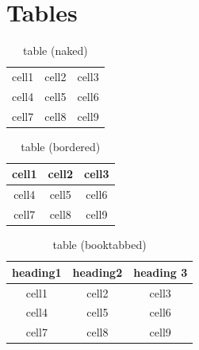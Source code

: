 \documentclass[12pt]{article}
\begin{document}
\section{Tables}
\begin{table}[H]
	\begin{center}
		\begin{tabular}{ c c c }
		cell1 & cell2 & cell3 \\ 
		cell4 & cell5 & cell6 \\  
		cell7 & cell8 & cell9    
		\end{tabular}
	\end{center}	
	\caption{table (naked)}
\end{table}

\begin{table}[H]
	\begin{center}
		\begin{tabular}{| c | c | c |}
			\hline
			cell1 & cell2 & cell3 \\
			\hline 
			cell4 & cell5 & cell6 \\  
			\hline
			cell7 & cell8 & cell9 \\
			\hline    
		\end{tabular}
	\end{center}
	\caption{table (bordered)}	
\end{table}

\begin{table}[H]
	\begin{center}
		\begin{tabular}{ c c c }
		\toprule
		heading1 & heading2 & heading 3 \\
		\midrule		
		cell1 & cell2 & cell3 \\ 
		cell4 & cell5 & cell6 \\  
		cell7 & cell8 & cell9 \\
		\bottomrule   
		\end{tabular}
	\end{center}
	\caption{table (booktabbed)}	
\end{table}
\end{document}
